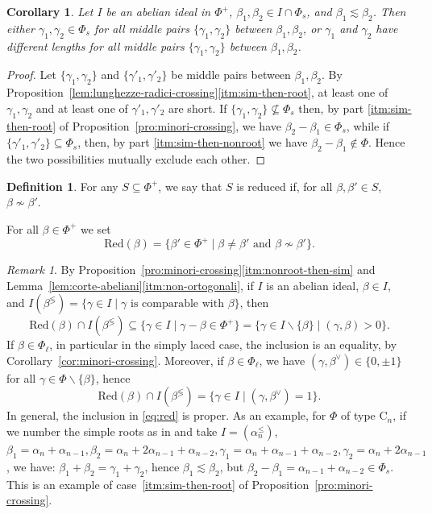 \documentclass[10pt]{amsart}
\newtheorem{cor}[thm]{Corollary}
\theoremstyle{definition}
\newtheorem{defi}[thm]{Definition}
\theoremstyle{remark}
\newtheorem{rem}[thm]{Remark}
\newcommand\smeno{\smallsetminus}
\newcommand\al{\alpha}
\newcommand\be{\beta}
\newcommand\ga{\gamma}
\newcommand\comp{\lessgtr}
\newcommand\nosim{\not\sim}
\newcommand\red{\mathrm{Red}}
\renewcommand{\leq}{\leqslant}
\begin{document}
\begin{cor}\label{cor:minori-crossing-2}
Let $I$ be an abelian ideal in $\Phi^+$, $\be_1, \be_2\in I\cap \Phi_s$, and $\be_1\lesssim \be_2$.
Then either $\ga_1, \ga_2\in \Phi_s$ for all middle pairs  $\{\ga_1, \ga_2\}$ between $\be_1, \be_2$, 
or $\ga_1$ and $\ga_2$ have different lengths for all middle pairs  $\{\ga_1, \ga_2\}$ between $\be_1, \be_2$.
\end{cor}

\begin{proof}
Let $\{\ga_1, \ga_2\}$ and $\{\ga'_1, \ga'_2\}$ be middle pairs between $\be_1, \be_2$. 
By Proposition~\ref{lem:lunghezze-radici-crossing}\ref{itm:sim-then-root}, at least one of $\ga_1, \ga_2$ and at least one of $\ga'_1, \ga'_2$ are short.
If $\{\ga_1, \ga_2\}\not\subseteq \Phi_s$ then, by part \ref{itm:sim-then-root} of Proposition~\ref{pro:minori-crossing}, we have $\be_2-\be_1\in \Phi_s$, while if $\{\ga'_1, \ga'_2\}\subseteq \Phi_s$, then, by part \ref{itm:sim-then-nonroot} we have $\be_2-\be_1\not\in \Phi$.
Hence the two possibilities mutually exclude each other.
\end{proof}

\begin{defi}\label{def:red}
For any  $S\subseteq\Phi^+$,  
we say that $S$ is reduced if, for all $\be, \be'\in S$, $\be\nosim \be'$. 
\par
For all $\be\in \Phi^+$ we set 
$$
\red(\be)=\{\be'\in \Phi^+\mid \be\neq \be' \text{ and } \be\not\sim \be'\}.
$$
\end{defi}

\begin{rem}\label{rem:red}
By Proposition~\ref{pro:minori-crossing}\ref{itm:nonroot-then-sim} and Lemma~\ref{lem:corte-abeliani}\ref{itm:non-ortogonali}, if $I$ is an abelian ideal, $\be\in I$, and $I( \be^{\comp})=\{\ga\in I\mid \ga\text{ is comparable with }\be\}$, then 
\begin{equation}\label{eq:red}
\red(\be)\cap I( \be^{\comp})\subseteq \{\ga\in I \mid \ga-\be\in \Phi^+\}= \{\ga\in I\smeno\{\be\}\mid (\ga,\be)> 0\}.
\end{equation}
If $\be\in \Phi_\ell$, in particular in the simply laced case, the inclusion is an equality, by Corollary~\ref{cor:minori-crossing}. 
Moreover, if $\be\in \Phi_\ell$, we have $(\ga, \be^\vee)\in \{0, \pm 1\}$ for all $\ga\in \Phi\smeno\{\be\}$, hence 
\begin{equation}\label{eq:red-2}
\red(\be)\cap I( \be^{\comp}) =\{\ga\in I \mid (\ga,\be^\vee) = 1\}.
\end{equation}
In general, the inclusion in \eqref{eq:red} is proper. 
As an example, for $\Phi$ of type $\mathrm C_n$, if we number the simple roots as in \cite{Bou} and take $I=(\al_n^\leq)$,  $\be_1=\al_n+\al_{n-1}, \be_2=\al_n+2\al_{n-1}+\al_{n-2}, \ga_1=\al_n+\al_{n-1}+\al_{n-2}, \ga_2=\al_n+2\al_{n-1}$, we have: $\be_1+\be_2=\ga_1+\ga_2$, hence $\be_1\lesssim \be_2$, but $\be_2-\be_1=\al_{n-1}+\al_{n-2}\in \Phi_s$.
This is an example of case~\ref{itm:sim-then-root} of Proposition~\ref{pro:minori-crossing}.
\end{rem}
\end{document}
